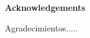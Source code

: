 
\newpage
\begin{center}
{\bf \Huge Acknowledgements}
\end{center}
\vspace{1cm}
\setlength{\baselineskip}{0.8cm}

Agradecimientos.....
